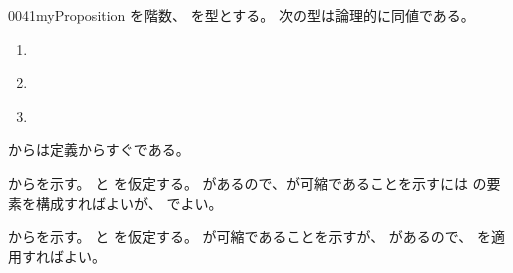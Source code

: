 \documentclass[index]{subfiles}
\begin{document}
\begin{myBlock}{0041}{myProposition}
  を階数、
  を型とする。
  次の型は論理的に同値である。
  \begin{enumerate}
  \item \label{0041:0000} 
  \item \label{0041:0001} 
  \item \label{0041:0002} 
  \end{enumerate}
\end{myBlock}
\begin{myProof}
  からは定義からすぐである。

  からを示す。
  と
  を仮定する。
  があるので、が可縮であることを示すには
  の要素を構成すればよいが、
  でよい。

  からを示す。
  と
  を仮定する。
  が可縮であることを示すが、
  があるので、
  を適用すればよい。
\end{myProof}
\end{document}
